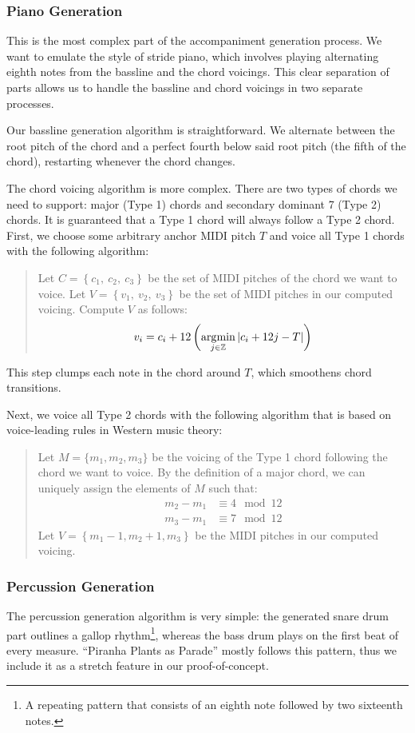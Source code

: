 \subsubsection{Piano Generation}

This is the most complex part of the accompaniment generation process. We want to emulate the style of stride piano, which involves playing alternating eighth notes from the bassline and the chord voicings. This clear separation of parts allows us to handle the bassline and chord voicings in two separate processes.

Our bassline generation algorithm is straightforward. We alternate between the root pitch of the chord and a perfect fourth below said root pitch (the fifth of the chord), restarting whenever the chord changes.

The chord voicing algorithm is more complex. There are two types of chords we need to support: major (Type 1) chords and secondary dominant 7 (Type 2) chords. It is guaranteed that a Type 1 chord will always follow a Type 2 chord. First, we choose some arbitrary anchor MIDI pitch $T$ and voice all Type 1 chords with the following algorithm:
\begin{quote}
    Let $C = \left\{ c_1, \ c_2, \ c_3 \right\}$ be the set of MIDI pitches of the chord we want to voice.
    Let $V = \left\{ v_1, \ v_2, \ v_3 \right\}$ be the set of MIDI pitches in our computed voicing.
    Compute $V$ as follows:
    $$v_i = c_i + 12 \left( \operatorname*{\arg\!\min}_{j \in \mathbb{Z}} \left\lvert c_i + 12j - T \right\rvert \right)$$
\end{quote}
This step clumps each note in the chord around $T$, which smoothens chord transitions.

Next, we voice all Type 2 chords with the following algorithm that is based on voice-leading rules in Western music theory:
\begin{quote}
    Let $M = \{ m_1, m_2, m_3\}$ be the voicing of the Type 1 chord following the chord we want to voice. By the definition of a major chord, we can uniquely assign the elements of $M$ such that:
    \begin{align*}
        m_2 - m_1 &\equiv 4 \mod 12 \\
        m_3 - m_1 &\equiv 7 \mod 12
    \end{align*}
    Let $V = \left\{ m_1 - 1, m_2 + 1, m_3 \right\}$ be the MIDI pitches in our computed voicing.
\end{quote}

\subsubsection{Percussion Generation}

The percussion generation algorithm is very simple: the generated snare drum part outlines a gallop rhythm\footnote{A repeating pattern that consists of an eighth note followed by two sixteenth notes.}, whereas the bass drum plays on the first beat of every measure. ``Piranha Plants as Parade'' mostly follows this pattern, thus we include it as a stretch feature in our proof-of-concept.
